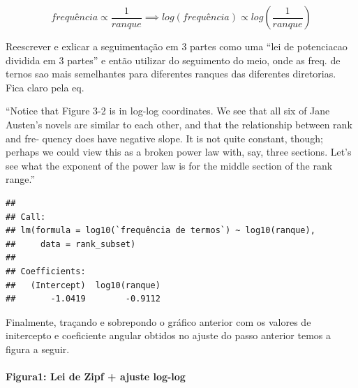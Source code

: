 \documentclass[]{article}
\newenvironment{Shaded}{\begin{snugshade}}{\end{snugshade}}
\newcommand{\KeywordTok}[1]{\textcolor[rgb]{0.13,0.29,0.53}{\textbf{#1}}}
\newcommand{\DataTypeTok}[1]{\textcolor[rgb]{0.13,0.29,0.53}{#1}}
\newcommand{\DecValTok}[1]{\textcolor[rgb]{0.00,0.00,0.81}{#1}}
\newcommand{\StringTok}[1]{\textcolor[rgb]{0.31,0.60,0.02}{#1}}
\newcommand{\OperatorTok}[1]{\textcolor[rgb]{0.81,0.36,0.00}{\textbf{#1}}}
\newcommand{\NormalTok}[1]{#1}
\let\oldparagraph\paragraph
\renewcommand{\paragraph}[1]{\oldparagraph{#1}\mbox{}}
\begin{document}
\[
frequência \propto \frac{1}{ranque} \implies log(frequência) \propto log\left(\frac{1}{ranque}\right)
\]

Reescrever e exlicar a seguimentação em 3 partes como uma ``lei de
potenciacao dividida em 3 partes'' e então utilizar do seguimento do
meio, onde as freq. de ternos sao mais semelhantes para diferentes
ranques das diferentes diretorias. Fica claro pela eq.

``Notice that Figure 3-2 is in log-log coordinates. We see that all six
of Jane Austen's novels are similar to each other, and that the
relationship between rank and fre‐ quency does have negative slope. It
is not quite constant, though; perhaps we could view this as a broken
power law with, say, three sections. Let's see what the exponent of the
power law is for the middle section of the rank range.''

\begin{Shaded}
\end{Shaded}

\begin{verbatim}
## 
## Call:
## lm(formula = log10(`frequência de termos`) ~ log10(ranque), 
##     data = rank_subset)
## 
## Coefficients:
##   (Intercept)  log10(ranque)  
##       -1.0419        -0.9112
\end{verbatim}

Finalmente, traçando e sobrepondo o gráfico anterior com os valores de
initercepto e coeficiente angular obtidos no ajuste do passo anterior
temos a figura a seguir.

\paragraph{Figura1: Lei de Zipf + ajuste
log-log}\label{figura1-lei-de-zipf-ajuste-log-log}
\end{document}

